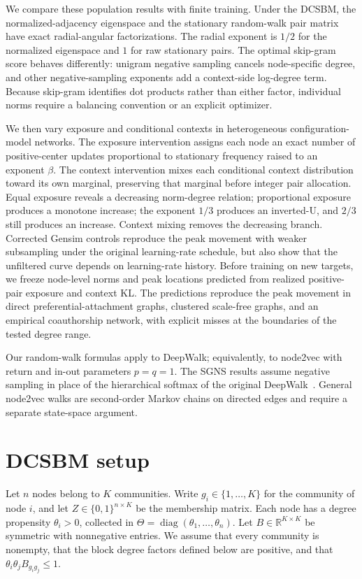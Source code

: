 \documentclass[aps,pre,reprint,superscriptaddress,longbibliography]{revtex4-2}
\newcommand{\R}{\mathbb{R}}
\DeclareMathOperator{\diag}{diag}
\begin{document}
We compare these population results with finite training.
Under the DCSBM, the normalized-adjacency eigenspace and the stationary random-walk pair matrix have exact radial-angular factorizations.
The radial exponent is \(1/2\) for the normalized eigenspace and \(1\) for raw stationary pairs.
The optimal skip-gram score behaves differently: unigram negative sampling cancels node-specific degree, and other negative-sampling exponents add a context-side log-degree term.
Because skip-gram identifies dot products rather than either factor, individual norms require a balancing convention or an explicit optimizer.

We then vary exposure and conditional contexts in heterogeneous configuration-model networks.
The exposure intervention assigns each node an exact number of positive-center updates proportional to stationary frequency raised to an exponent \(\beta\).
The context intervention mixes each conditional context distribution toward its own marginal, preserving that marginal before integer pair allocation.
Equal exposure reveals a decreasing norm-degree relation; proportional exposure produces a monotone increase; the exponent \(1/3\) produces an inverted-U, and \(2/3\) still produces an increase.
Context mixing removes the decreasing branch.
Corrected Gensim controls reproduce the peak movement with weaker subsampling under the original learning-rate schedule, but also show that the unfiltered curve depends on learning-rate history.
Before training on new targets, we freeze node-level norms and peak locations predicted from realized positive-pair exposure and context KL.
The predictions reproduce the peak movement in direct preferential-attachment graphs, clustered scale-free graphs, and an empirical coauthorship network, with explicit misses at the boundaries of the tested degree range.

Our random-walk formulas apply to DeepWalk; equivalently, to node2vec with return and in-out parameters \(p=q=1\).
The SGNS results assume negative sampling in place of the hierarchical softmax of the original DeepWalk~\citep{perozzi2014deepwalk}.
General node2vec walks are second-order Markov chains on directed edges and require a separate state-space argument.

\section{DCSBM setup}
\label{sec:setup}

Let \(n\) nodes belong to \(K\) communities.
Write \(g_i\in\{1,\dots,K\}\) for the community of node \(i\), and let \(Z\in\{0,1\}^{n\times K}\) be the membership matrix.
Each node has a degree propensity \(\theta_i>0\), collected in \(\Theta=\diag(\theta_1,\dots,\theta_n)\).
Let \(B\in\R^{K\times K}\) be symmetric with nonnegative entries.
We assume that every community is nonempty, that the block degree factors defined below are positive, and that \(\theta_i\theta_jB_{g_i g_j}\leq 1\).
\end{document}

